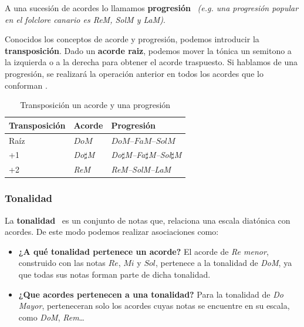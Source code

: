 A una sucesión de acordes lo llamamos \textbf{\gls{progresión}}~\cite{wikipedia_progresion} \emph{(e.g. una progresión popular en el folclore canario es ReM, SolM y LaM)}.

Conocidos los conceptos de acorde y progresión, podemos introducir la \textbf{\gls{transposición}}. Dado un \textbf{acorde raiz}, podemos mover la tónica un semitono a la izquierda o a la derecha para obtener el acorde traspuesto. Si hablamos de una progresión, se realizará la operación anterior en todos los acordes que lo conforman .

\begin{table}[H]
    \centering
    \caption{Transposición un acorde y una progresión}\label{tab:transposicion_acordes_progresiones}
    \scriptsize
    \begin{tabular}{l l l}
        \hline
        \textbf{Transposición} & \textbf{Acorde} & \textbf{Progresión} \\
        \hline
        Raíz & $DoM$ & $DoM–FaM–SolM$ \\
        +1 & \textit{Do$\sharp$M} & \textit{Do$\sharp$M–Fa$\sharp$M–Sol$\sharp$M} \\
        +2 & \textit{ReM} & \textit{ReM–SolM–LaM} \\
        \hline
    \end{tabular}
\end{table}

\subsubsection{Tonalidad}
La \textbf{tonalidad}~\cite{wikipedia_tonalidad} es un conjunto de notas que, relaciona una escala diatónica con acordes. De este modo podemos realizar asociaciones como:

\begin{itemize}
    \item \textbf{¿A qué tonalidad pertenece un acorde?} 
      El acorde de \textit{Re menor}, construido con las notas $Re$, $Mi$ y $Sol$, 
      pertenece a la tonalidad de \textit{DoM}, ya que todas sus notas forman parte de dicha tonalidad.
    \item \textbf{¿Que acordes pertenecen a una tonalidad?}
      Para la tonalidad de \textit{Do Mayor}, perteneceran solo los acordes cuyas notas se encuentre en su escala, como \textit{DoM}, \textit{Rem}\dots
\end{itemize}

